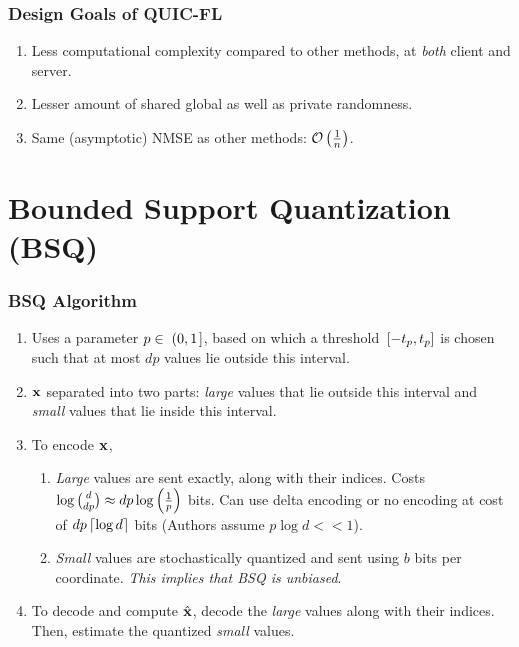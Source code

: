 \documentclass{beamer}
\begin{document}
    \begin{frame}
        \frametitle{Design Goals of QUIC-FL}
        \begin{enumerate}
            \item Less computational complexity compared to other methods, at
            \emph{both} client and server.
            \item Lesser amount of shared global as well as private randomness.
            \item Same (asymptotic) NMSE as other methods: \(\mathcal O\left(\frac{1}{n}\right)\).
        \end{enumerate}
    \end{frame}

    \section{Bounded Support Quantization (BSQ)}
    \begin{frame}
        \frametitle{BSQ Algorithm}
        \begin{enumerate}
            \item Uses a parameter \(p\in{}\left.\left(0,1\right.\right]\), based on which 
            a threshold  \({}\left[-t_p,t_p\right]\) is chosen such that at most \(dp\)
            values lie outside this interval.
            \item \(\boldsymbol{\mathbf{x}}\) separated into two parts: \emph{large}
            values that lie outside this interval and \emph{small} values
            that lie inside this interval.
            \item To encode \(\boldsymbol{\mathbf{x}}\),
            \begin{enumerate}
                \item \emph{Large} values are sent exactly, along with their
                indices. Costs \(\log\binom{d}{dp} \approx 
                dp\log\left(\frac{1}{p}\right)\) bits. Can use delta encoding or
                no encoding at cost of \(dp\left\lceil\log d\right\rceil\) bits (Authors assume
                \(p\log d << 1\)).
                \item \emph{Small} values are stochastically quantized and sent
                using \(b\) bits per coordinate. \emph{This implies that BSQ is
                unbiased}.
            \end{enumerate}
            \item To decode and compute \(\hat{\boldsymbol{\mathbf{x}}}\), decode the
            \emph{large} values along with their indices. Then, estimate the
            quantized \emph{small} values.
        \end{enumerate}
    \end{frame}
\end{document}
